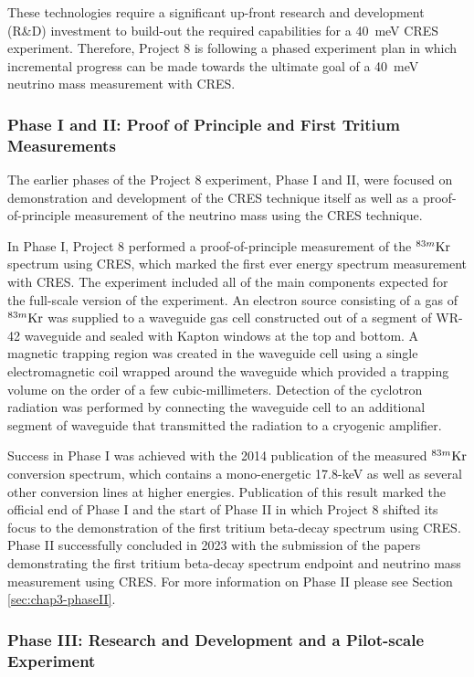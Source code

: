 These technologies require a significant up-front research and development (R\&D) investment to build-out the required capabilities for a 40~meV CRES experiment. Therefore, Project 8 is following a phased experiment plan in which incremental progress can be made towards the ultimate goal of a 40~meV neutrino mass measurement with CRES.

\subsubsection*{Phase I and II: Proof of Principle and First Tritium Measurements}

The earlier phases of the Project 8 experiment, Phase I and II, were focused on demonstration and development of the CRES technique itself as well as a proof-of-principle measurement of the neutrino mass using the CRES technique.

In Phase I, Project 8 performed a proof-of-principle measurement of the $^{83m}\rm{Kr}$ spectrum using CRES, which marked the first ever energy spectrum measurement with CRES. The experiment included all of the main components expected for the full-scale version of the experiment. An electron source consisting of a gas of $^{83m}\rm{Kr}$ was supplied to a waveguide gas cell constructed out of a segment of WR-42 waveguide and sealed with Kapton windows at the top and bottom. A magnetic trapping region was created in the waveguide cell using a single electromagnetic coil wrapped around the waveguide which provided a trapping volume on the order of a few cubic-millimeters. Detection of the cyclotron radiation was performed by connecting the waveguide cell to an additional segment of waveguide that transmitted the radiation to a cryogenic amplifier.

Success in Phase I was achieved with the 2014 publication of the measured $^{83m}\rm{Kr}$ conversion spectrum, which contains a mono-energetic 17.8-keV as well as several other conversion lines at higher energies. Publication of this result marked the official end of Phase I and the start of Phase II in which Project 8 shifted its focus to the demonstration of the first tritium beta-decay spectrum using CRES. Phase II successfully concluded in 2023 with the submission of the papers demonstrating the first tritium beta-decay spectrum endpoint and neutrino mass measurement using CRES. For more information on Phase II please see Section \ref{sec:chap3-phaseII}.

\subsubsection*{Phase III: Research and Development and a Pilot-scale Experiment}

